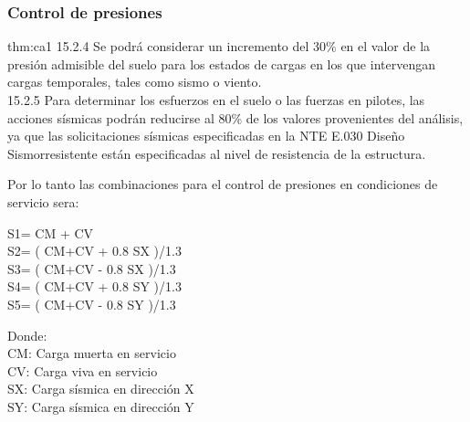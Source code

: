 \subsubsection{Control de presiones}
\begin{theo}[15.2.4 y 15.2.5 de la norma E-060:]{thm:ca1}
15.2.4 Se podrá considerar un incremento del 30\% en el valor de la presión admisible del suelo para los estados de cargas en los que intervengan cargas temporales, tales como sismo o viento.\\
15.2.5 Para determinar los esfuerzos en el suelo o las fuerzas en pilotes, las acciones sísmicas podrán reducirse al 80\% de los valores provenientes del análisis, ya que las solicitaciones sísmicas especificadas en la NTE E.030 Diseño Sismorresistente están especificadas al nivel de resistencia de la estructura.
\end{theo}
\newpage
\noindent Por lo tanto las combinaciones para el control de presiones en condiciones de servicio sera:
\begin{center}
    S1= CM + CV\\
    S2= ( CM+CV + 0.8 SX )/1.3\\
    S3= ( CM+CV - 0.8 SX )/1.3\\
    S4= ( CM+CV + 0.8 SY )/1.3\\
    S5= ( CM+CV - 0.8 SY )/1.3 
\end{center}
\noindent 
Donde:\\
CM: Carga muerta en servicio\\
CV: Carga viva en servicio\\
SX: Carga sísmica en dirección X\\
SY: Carga sísmica en dirección Y\\

